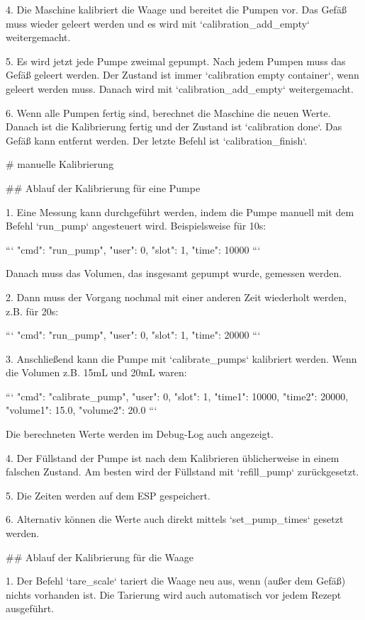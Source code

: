 4. Die Maschine kalibriert die Waage und bereitet die Pumpen vor. Das Gefäß muss wieder geleert werden und es wird mit `calibration_add_empty` weitergemacht.

5. Es wird jetzt jede Pumpe zweimal gepumpt. Nach jedem Pumpen muss das Gefäß geleert werden. Der Zustand ist immer `calibration empty container`, wenn geleert werden muss. Danach wird mit `calibration_add_empty` weitergemacht.

6. Wenn alle Pumpen fertig sind, berechnet die Maschine die neuen Werte. Danach ist die Kalibrierung fertig und der Zustand ist `calibration done`. Das Gefäß kann entfernt werden. Der letzte Befehl ist `calibration_finish`.


# manuelle Kalibrierung

## Ablauf der Kalibrierung für eine Pumpe

1. Eine Messung kann durchgeführt werden, indem die Pumpe manuell mit dem Befehl `run_pump` angesteuert wird. Beispielsweise für 10s:

```
{"cmd": "run_pump", "user": 0, "slot": 1, "time": 10000}
```

Danach muss das Volumen, das insgesamt gepumpt wurde, gemessen werden.

2. Dann muss der Vorgang nochmal mit einer anderen Zeit wiederholt werden, z.B. für 20s:

```
{"cmd": "run_pump", "user": 0, "slot": 1, "time": 20000}
```

3. Anschließend kann die Pumpe mit `calibrate_pumps` kalibriert werden. Wenn die Volumen z.B. 15mL und 20mL waren:

```
{"cmd": "calibrate_pump", "user": 0, "slot": 1, "time1": 10000, "time2": 20000, "volume1": 15.0, "volume2": 20.0}
```

Die berechneten Werte werden im Debug-Log auch angezeigt.

4. Der Füllstand der Pumpe ist nach dem Kalibrieren üblicherweise in einem falschen Zustand. Am besten wird der Füllstand mit `refill_pump` zurückgesetzt.

5. Die Zeiten werden auf dem ESP gespeichert.

6. Alternativ können die Werte auch direkt mittels `set_pump_times` gesetzt werden.


## Ablauf der Kalibrierung für die Waage

1. Der Befehl `tare_scale` tariert die Waage neu aus, wenn (außer dem Gefäß) nichts vorhanden ist. Die Tarierung wird auch automatisch vor jedem Rezept ausgeführt.

